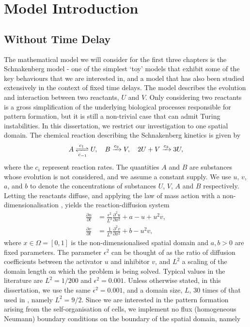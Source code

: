 \section{Model Introduction}
\subsection{Without Time Delay}
The mathematical model we will consider for the first three chapters is the Schnakenberg model \cite{schnakenberg} - one of the simplest `toy' models that exhibit some of the key behaviours that we are interested in, and a model that has also been studied extensively in the context of fixed time delays. The model describes the evolution and interaction between two reactants, $U$ and $V$. Only considering two reactants is a gross simplification of the underlying biological processes responsible for pattern formation, but it is still a non-trivial case that can admit Turing instabilities. In this dissertation, we restrict our investigation to one spatial domain. The chemical reaction describing the Schnakenberg kinetics \cite{baker} is given by
\begin{equation}\label{chem}
A\xrightleftharpoons[c_{-1}]{c_1} U,\quad B\xrightarrow{c_2} V,\quad 2U+V\xrightarrow{c_3} 3U,
\end{equation}
where the $c_i$ represent reaction rates. The quantities $A$ and $B$ are substances whose evolution is not considered, and we assume a constant supply. We use $u$, $v$, $a$, and $b$ to denote the concentrations of substances $U$, $V$, $A$ and $B$ respectively. Letting the reactants diffuse, and applying the law of mass action with a non-dimensionalisation \cite{murray}, yields the reaction-diffusion system
\begin{equation}\label{system}
    \begin{split}
    \frac{\partial u}{\partial t}&=\frac{\epsilon^2}{L^2}\frac{\partial^2 u}{\partial x^2}+a-u+u^2v,\\
    \frac{\partial v}{\partial t}&=\frac{1}{L^2}\frac{\partial^2 v}{\partial x^2}+b-u^2v,
    \end{split}
\end{equation}
where $x\in\Omega=[0,1]$ is the non-dimensionalised spatial domain and $a,b>0$ are fixed parameters. The parameter $\epsilon^2$ can be thought of as the ratio of diffusion coefficients between the activator $u$ and inhibitor $v$, and $L^2$ a scaling of the domain length on which the problem is being solved. Typical values in the literature \cite{gaffmonk} are $L^2=1/200$ and $\epsilon^2=0.001$. Unless otherwise stated, in this dissertation, we use the same $\epsilon^2=0.001$, and a domain size, $L$, $30$ times of that used in \cite{gaffmonk}, namely $L^2=9/2$. Since we are interested in the pattern formation arising from the self-organisation of cells, we implement no flux (homogeneous Neumann) boundary conditions on the boundary of the spatial domain, namely
